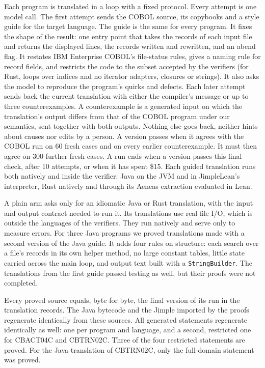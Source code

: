 Each program is translated in a loop with a fixed protocol. Every attempt is one model call. The first attempt sends
the COBOL source, its copybooks and a style guide for the target language. The guide is the same for every program.
It fixes the shape of the result: one entry point that takes the records of each input file and returns the
displayed lines, the records written and rewritten, and an abend flag. It restates IBM Enterprise COBOL's file-status
rules, gives a naming rule for record fields, and restricts the code to the subset accepted by the verifiers (for
Rust, loops over indices and no iterator adapters, closures or strings). It also asks the model to reproduce the
program's quirks and defects. Each later attempt sends back the current translation with either the compiler's
message or up to three counterexamples. A counterexample is a generated input on which the translation's output
differs from that of the COBOL program under our semantics, sent together with both outputs. Nothing else goes back, neither
hints about causes nor edits by a person. A version passes when it agrees with the COBOL run on 60 fresh cases and on every earlier
counterexample. It must then agree on 300 further fresh cases. A run ends when a version passes this final check,
after 10 attempts, or when it has spent \$15. Each guided translation runs both natively and inside the verifier: Java on
the JVM and in JimpleLean's interpreter, Rust natively and through its Aeneas extraction evaluated in Lean.

A plain arm asks only for an idiomatic Java or Rust translation, with the input and output contract needed to run
it. Its translations use real file I/O, which is outside the languages of the verifiers. They run natively and serve only to measure errors. For three Java programs we proved translations made with a second version of the Java guide.
It adds four rules on structure: each search over a file's records in its own helper method, no large constant
tables, little state carried across the main loop, and output text built with a \texttt{StringBuilder}. The
translations from the first guide passed testing as well, but their proofs were not completed.

Every proved source equals, byte for byte, the final version of its run in the translation records. The Java bytecode and the Jimple imported by the proofs regenerate identically from these sources. All \aStatements{}
generated statements regenerate identically as well: one per program and language, and a second,
restricted one for CBACT04C and CBTRN02C. Three of the four restricted statements are proved. For the Java
translation of CBTRN02C, only the full-domain statement was proved.

